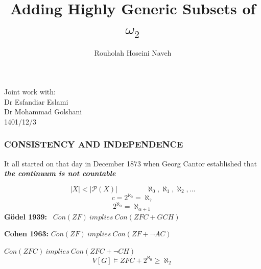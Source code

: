 \documentclass{beamer}
\begin{document}
\title{Adding Highly Generic Subsets of $\omega_2$}

\author{Rouholah Hoseini Naveh}
\begin{frame}
\date{}
\maketitle

\begin{center}
Joint work with:\\
Dr Esfandiar Eslami\\
Dr Mohammad Golshani\\
\vspace{10mm}
1401/12/3
\end{center}
\end{frame}
\begin{frame}
\frametitle{CONSISTENCY AND INDEPENDENCE}
It all started on that day in December 1873 when Georg Cantor established that \textit{\textbf{{\large the continuum is not countable}}}

$$|X| < |\mathcal{P}(X)| \qquad \qquad \aleph_0, \aleph_1, \aleph_2, \dots$$
\pause
$$c= 2^{\aleph_0} = \aleph_?$$
$$2^{\aleph_{\alpha}}= \aleph_{\alpha+1}$$
\pause
\textbf{G\"{o}del 1939:} \ $Con(ZF) \ implies \ Con(ZFC + GCH)$
\vspace{5mm}

\textbf{Cohen 1963:} $ Con(ZF) \ implies \ Con(ZF + \neg AC)$

\hspace{25.5mm}$Con(ZFC) \ implies \ Con(ZFC + \neg CH)$
$$V[G] \models ZFC + 2^{\aleph_0}\geq \aleph_2$$
\end{frame}
\end{document}
